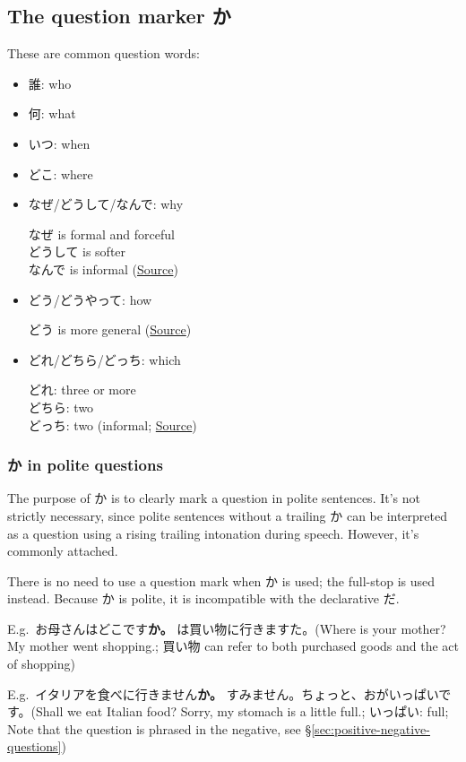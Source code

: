 \documentclass[../nihongo-gakushuu-kyouzai.tex]{subfiles}
\begin{document}
\subsection{The question marker か}
These are common question words:
\begin{itemize}
    \item 誰: who
    \item 何: what
    \item いつ: when
    \item どこ: where
    \item なぜ/どうして/なんで: why

    なぜ is formal and forceful\\
    どうして is softer\\
    なんで is informal (\href{https://www.reddit.com/r/LearnJapanese/comments/nxxep9/difference_between_%E3%81%A9%E3%81%86%E3%81%97%E3%81%A6_%E3%81%AA%E3%82%93%E3%81%A7_and_%E3%81%AA%E3%81%9C/}{Source})
    \item どう/どうやって: how

    どう is more general (\href{https://ja.hinative.com/questions/161399}{Source})
    \item どれ/どちら/どっち: which

    どれ: three or more\\
    どちら: two\\
    どっち: two (informal; \href{https://www.tofugu.com/japanese-grammar/kore-sore-are-dore/}{Source})
\end{itemize}

\subsubsection{か in polite questions}
The purpose of か is to clearly mark a question in polite sentences. It's not strictly necessary, since polite sentences without a trailing か can be interpreted as a question using a rising trailing intonation during speech. However, it's commonly attached.

There is no need to use a question mark when か is used; the full-stop is used instead. Because か is polite, it is incompatible with the declarative だ.

E.g.\ お母さんはどこです\textbf{か。} は買い物に行きますた。(Where is your mother? My mother went shopping.; 買い物 can refer to both purchased goods and the act of shopping)

E.g.\ イタリアを食べに行きません\textbf{か。} すみません。ちょっと、おがいっぱいです。(Shall we eat Italian food? Sorry, my stomach is a little full.; いっぱい: full; Note that the question is phrased in the negative, see \S\ref{sec:positive-negative-questions})
\end{document}
